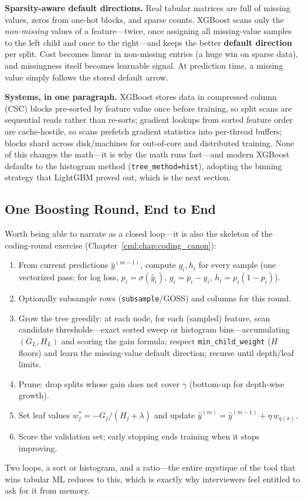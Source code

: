 \textbf{Sparsity-aware default directions.} Real tabular matrices are full of missing values, zeros from one-hot blocks, and sparse counts. XGBoost scans only the \textit{non-missing} values of a feature---twice, once assigning all missing-value samples to the left child and once to the right---and keeps the better \textbf{default direction} per split. Cost becomes linear in non-missing entries (a huge win on sparse data), and missingness itself becomes learnable signal. At prediction time, a missing value simply follows the stored default arrow.

\textbf{Systems, in one paragraph.} XGBoost stores data in compressed column (CSC) blocks pre-sorted by feature value once before training, so split scans are sequential reads rather than re-sorts; gradient lookups from sorted feature order are cache-hostile, so scans prefetch gradient statistics into per-thread buffers; blocks shard across disk/machines for out-of-core and distributed training. None of this changes the math---it is why the math runs fast---and modern XGBoost defaults to the histogram method (\texttt{tree\_method=hist}), adopting the binning strategy that LightGBM proved out, which is the next section.

\subsection{One Boosting Round, End to End}

Worth being able to narrate as a closed loop---it is also the skeleton of the coding-round exercise (Chapter~\ref{cml:chap:coding_canon}):
\begin{enumerate}
    \item From current predictions $\hat{y}^{(m-1)}$, compute $g_i, h_i$ for every sample (one vectorized pass; for log loss, $p_i = \sigma(\hat{y}_i)$, $g_i = p_i - y_i$, $h_i = p_i(1-p_i)$).
    \item Optionally subsample rows (\texttt{subsample}/GOSS) and columns for this round.
    \item Grow the tree greedily: at each node, for each (sampled) feature, scan candidate thresholds---exact sorted sweep or histogram bins---accumulating $(G_L, H_L)$ and scoring the gain formula; respect \texttt{min\_child\_weight} ($H$ floors) and learn the missing-value default direction; recurse until depth/leaf limits.
    \item Prune: drop splits whose gain does not cover $\gamma$ (bottom-up for depth-wise growth).
    \item Set leaf values $w_j^* = -G_j/(H_j + \lambda)$ and update $\hat{y}^{(m)} = \hat{y}^{(m-1)} + \eta\, w_{q(x)}$.
    \item Score the validation set; early stopping ends training when it stops improving.
\end{enumerate}
Two loops, a sort or histogram, and a ratio---the entire mystique of the tool that wins tabular ML reduces to this, which is exactly why interviewers feel entitled to ask for it from memory.

